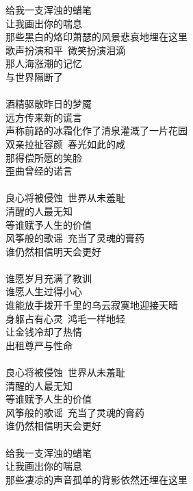 \documentclass[a5paper]{ctexart}
\begin{document}
	\begin{center}
		给我一支浑浊的蜡笔\\
		让我画出你的喘息\\
		那些黑白的烙印萧瑟的风景悲哀地埋在这里\\
		歌声扮演和平\   微笑扮演泪滴\\
		那人海涨潮的记忆\\
		与世界隔断了\\
		\hspace*{\fill} \\
		酒精驱散昨日的梦魇\\
		远方传来新的谎言\\
		声称前路的冰霜化作了清泉灌溉了一片花园\\
		双亲拉扯容颜\   春光如此的咸\\
		那得偿所愿的笑脸\\
		歪曲曾经的诺言\\
		\hspace*{\fill} \\
		良心将被侵蚀\   世界从未羞耻\\
		清醒的人最无知\\
		等谁赋予人生的价值\\
		风筝般的歌谣\   充当了灵魂的膏药\\
		谁仍然相信明天会更好\\
		\hspace*{\fill} \\
		谁愿岁月充满了教训\\
		谁愿人生过得小心\\
		谁能放手拨开千里的乌云寂寞地迎接天晴\\
		身躯占有心灵\   鸿毛一样地轻\\
		让金钱冷却了热情\\
		出租尊严与性命\\ 
		\hspace*{\fill} \\
		良心将被侵蚀\   世界从未羞耻\\
		清醒的人最无知\\
		等谁赋予人生的价值\\
		风筝般的歌谣\   充当了灵魂的膏药\\
		谁仍然相信明天会更好\\
		\hspace*{\fill} \\
		给我一支浑浊的蜡笔\\
		让我画出你的喘息\\
		那些凄凉的声音孤单的背影依然还埋在这里\\

\end{center}
\end{document}
